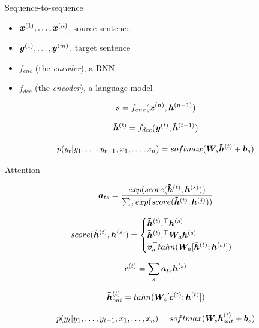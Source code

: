 \documentclass[10pt]{beamer}
\begin{document}
\begin{frame}{Sequence-to-sequence}
\begin{itemize}
\item $\bm{x}^{(1)}, \dots, \bm{x}^{(n)}$, source sentence
\item $\bm{y}^{(1)}, \dots, \bm{y}^{(m)}$, target sentence
\item $f_{enc}$ (the \textit{encoder}), a RNN
\item $f_{dec}$ (the \textit{encoder}), a language model
\end{itemize}


\begin{equation}
\bm{s} = f_{enc}(\bm{x}^{(n)}, \bm{h}^{(n-1)})
\end{equation}

\begin{equation}
\bm{\tilde{h}}^{(t)} = f_{dec}(\bm{y}^{(t)}, \bm{\tilde{h}}^{(t-1)})
\end{equation}

\begin{equation}
p(y_t | y_1, \dots, y_{t-1}, x_1, \dots, x_{n}) = softmax(\bm{W}_{s}  \bm{\tilde{h}}^{(t)} + \bm{b}_s)
\end{equation}


\end{frame}

\begin{frame}{Attention}

\begin{equation}
\bm{a}_{ts} = \frac{exp(score(\bm{\tilde{h}}^{(t)},\bm{h}^{(s)}))}{\sum_j exp(score(\bm{\tilde{h}}^{(t)},\bm{h}^{(j)}))}
\end{equation}

\begin{equation}
score(\bm{\tilde{h}}^{(t)},\bm{h}^{(s)}) = \begin{cases}
{\bm{\tilde{h}}^{(t)}} .^{\top} \bm{h}^{(s)}\\
\bm{\tilde{h}}^{(t)} .^{\top}\bm{W}_a \bm{h}^{(s)}\\
\bm{v}_a ^{\top}tahn(\bm{W}_a[\bm{\tilde{h}}^{(t)};\bm{h}^{(s)}])\\
\end{cases}
\end{equation}

\begin{equation}
\bm{c}^{(t)} = \sum_{s} \bm{a}_{ts}\bm{h}^{(s)}
\end{equation}

\begin{equation}
\bm{\tilde{h}}^{(t)}_{out} = tahn(\bm{W}_c[\bm{c}^{(t)};\bm{h}^{(t)}])
\end{equation}

\begin{equation}
p(y_t | y_1, \dots, y_{t-1}, x_1, \dots, x_{n}) = softmax(\bm{W}_{s}  \bm{\tilde{h}}^{(t)}_{out} + \bm{b}_s)
\end{equation}

\end{frame}
\end{document}
